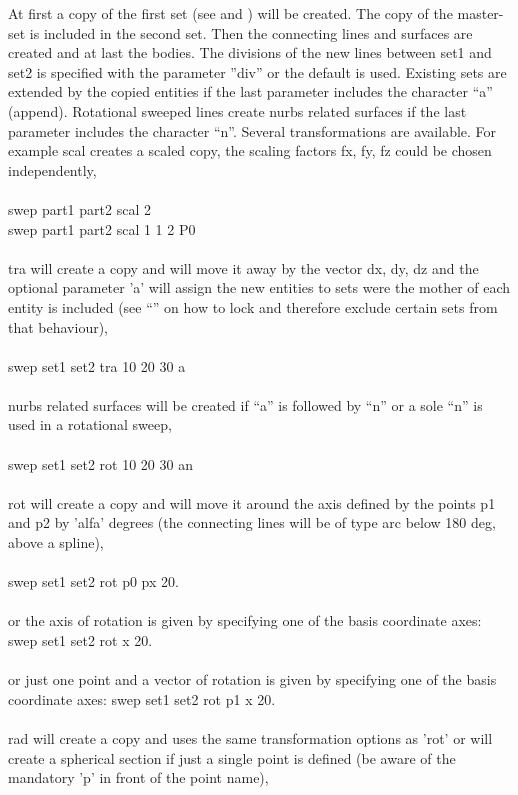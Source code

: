 \documentclass{article}
\begin{document}
At first a copy of the first set (see  and ) will be created. The copy of the master-set is included in the second set. Then the connecting lines and surfaces are created and at last the bodies. The divisions of the new lines between set1 and set2 is specified with the parameter ''div'' or the default is used. Existing sets are extended by the copied entities if the last parameter includes the character ``a'' (append). Rotational sweeped lines create nurbs related surfaces if the last parameter includes the character ``n''. Several transformations are available. For example scal creates a scaled copy, the scaling factors fx, fy, fz could be chosen independently,\\\\
swep part1 part2 scal 2 \\
swep part1 part2 scal 1 1 2 P0\\\\
tra will create a copy and will move it away by the vector dx, dy, dz and the optional parameter 'a' will assign the new entities to sets were the mother of each entity is included (see ``'' on how to lock and therefore exclude certain sets from that behaviour),\\\\
swep set1 set2 tra 10 20 30 a\\\\
nurbs related surfaces will be created if ``a'' is followed by ``n'' or a sole ``n'' is used in a rotational sweep,\\\\ 
swep set1 set2 rot 10 20 30 an\\\\
rot will create a copy and will move it around the axis defined by the points p1 and p2 by 'alfa' degrees (the connecting lines will be of type arc below 180 deg, above a spline),\\\\
swep set1 set2 rot p0 px 20.\\\\
or the axis of rotation is given by specifying one of the basis coordinate axes:
swep set1 set2 rot x 20.\\\\
or just one point and a vector of rotation is given by specifying one of the basis coordinate axes:
swep set1 set2 rot p1 x 20.\\\\
rad will create a copy and uses the same transformation options as 'rot' or will create a spherical section if just a single point is defined (be aware of the mandatory 'p' in front of the point name),\\\\
\end{document}
